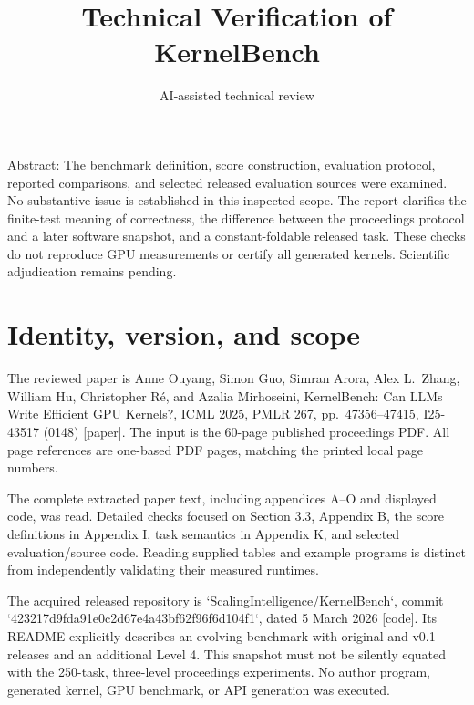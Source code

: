 \documentclass[10pt]{article}
\title{Technical Verification of KernelBench}
\author{AI-assisted technical review}
\date{}
\begin{document}
\maketitle
Abstract: The benchmark definition, score construction, evaluation protocol, reported comparisons, and selected released evaluation sources were examined. No substantive issue is established in this inspected scope. The report clarifies the finite-test meaning of correctness, the difference between the proceedings protocol and a later software snapshot, and a constant-foldable released task. These checks do not reproduce GPU measurements or certify all generated kernels. Scientific adjudication remains pending.\par
\section*{Identity, version, and scope}
The reviewed paper is Anne Ouyang, Simon Guo, Simran Arora, Alex L. Zhang, William Hu, Christopher Ré, and Azalia Mirhoseini, KernelBench: Can LLMs Write Efficient GPU Kernels?, ICML 2025, PMLR 267, pp. 47356–47415, I25-43517 (0148) [paper]. The input is the 60-page published proceedings PDF. All page references are one-based PDF pages, matching the printed local page numbers.\par
The complete extracted paper text, including appendices A–O and displayed code, was read. Detailed checks focused on Section 3.3, Appendix B, the score definitions in Appendix I, task semantics in Appendix K, and selected evaluation/source code. Reading supplied tables and example programs is distinct from independently validating their measured runtimes.\par
The acquired released repository is `ScalingIntelligence/KernelBench`, commit `423217d9fda91e0c2d67e4a43bf62f96f6d104f1`, dated 5 March 2026 [code]. Its README explicitly describes an evolving benchmark with original and v0.1 releases and an additional Level 4. This snapshot must not be silently equated with the 250-task, three-level proceedings experiments. No author program, generated kernel, GPU benchmark, or API generation was executed.\par
\end{document}

